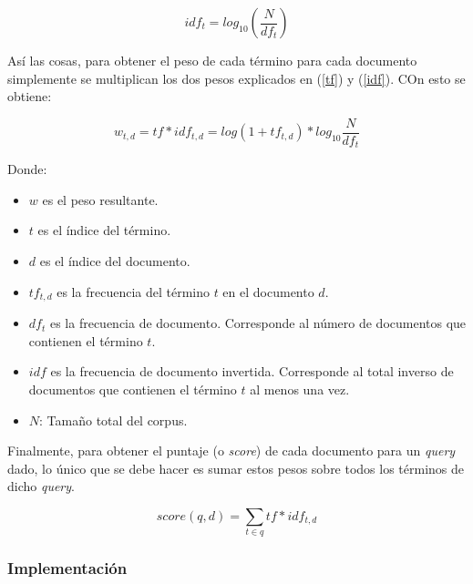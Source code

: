 \begin{equation}
    idf_t = log_{10} \left(\frac{N}{df_t}\right)
    \label{idf}
\end{equation}

Así las cosas, para obtener el peso de cada término para cada documento simplemente se multiplican los dos pesos explicados en (\ref{tf}) y (\ref{idf}). COn esto se obtiene: 

\begin{equation}
    w_{t,d} = tf * idf_{t,d} = log(1 + tf_{t,d}) * log_{10}\frac{N}{df_t}
    \label{eq:tfidf}
\end{equation}

Donde:
\begin{itemize}
    \item $w$ es el peso resultante.
    \item $t$ es el índice del término.
    \item $d$ es el índice del documento.
    \item $tf_{t,d}$ es la frecuencia del término $t$ en el documento $d$.
    \item $df_{t}$ es la frecuencia de documento. Corresponde al número de documentos que contienen el término $t$. 
    \item $idf$ es la frecuencia de documento invertida. Corresponde al total inverso de documentos que contienen el término $t$ al menos una vez.
    \item $N$: Tamaño total del corpus.
\end{itemize}

Finalmente, para obtener el puntaje (o \textit{score}) de cada documento para un \textit{query} dado, lo único que se debe hacer es sumar estos pesos sobre todos los términos de dicho \textit{query}.

\begin{equation}
    score(q,d) = \sum_{t\in q} tf * idf_{t,d}
\end{equation}

\subsubsection{Implementación}

